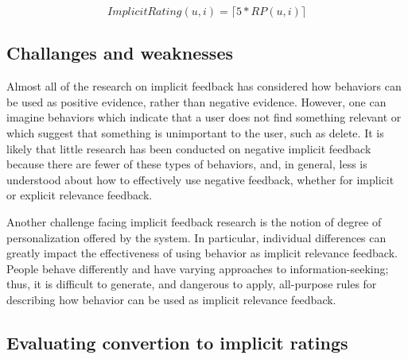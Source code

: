 \begin{equation}
  ImplicitRating(u,i) = \lceil 5 * RP(u,i) \rceil
\end{equation}


\subsection{Challanges and weaknesses}
\label{implicit-weaknesses}

Almost all of the research on implicit feedback has considered how behaviors
can be used as positive evidence, rather than negative evidence. However, one
can imagine behaviors which indicate that a user does not find something
relevant or which suggest that something is unimportant to the user, such as
delete. It is likely that little research has been conducted on negative
implicit feedback because there are fewer of these types of behaviors, and, in
general, less is understood about how to effectively use negative feedback,
whether for implicit or explicit relevance feedback. 

Another challenge facing implicit feedback research is the notion of degree of
personalization offered by the system. In particular, individual differences
can greatly impact the effectiveness of using behavior as implicit relevance
feedback. People behave differently and have varying approaches to
information-seeking; thus, it is difficult to generate, and dangerous to apply,
all-purpose rules for describing how behavior can be used as implicit relevance
feedback.



\subsection{Evaluating convertion to implicit ratings}

